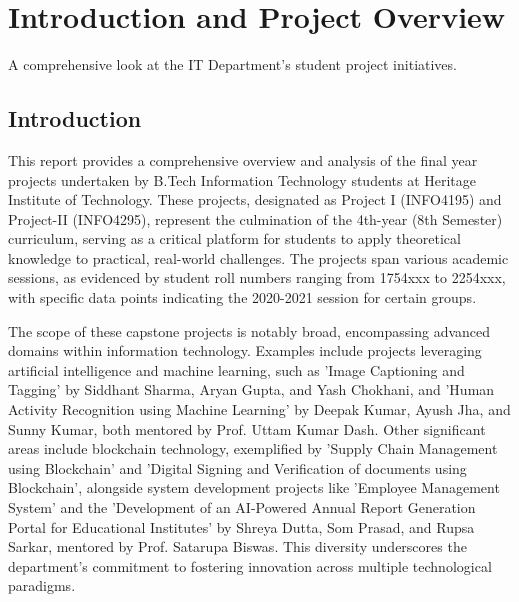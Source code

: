 \documentclass[11pt,a4paper]{article}
\newenvironment{card}{
    \begin{tcolorbox}[
        enhanced,
        colback=cardback,
        colframe=border,
        sharp corners,
        boxrule=0.5pt,
        drop shadow,
        drop shadow={shadow xshift=1mm,shadow yshift=-1mm,fill=border!50},
        boxsep=3mm,
        left=5mm, right=5mm, top=5mm, bottom=5mm,
        width=\textwidth,
        nobeforeafter
    ]
}{\end{tcolorbox}}
\begin{document}
\clearpage

\section*{\textcolor{accent}{Introduction and Project Overview}}
{\large\textcolor{muted}{A comprehensive look at the IT Department's student project initiatives.}}

\vspace{0.5cm}

\begin{card}
    \subsection*{\textcolor{accent}{Introduction}}
    \vspace{0.3cm}
    This report provides a comprehensive overview and analysis of the final year projects undertaken by B.Tech Information Technology students at Heritage Institute of Technology. These projects, designated as Project I (INFO4195) and Project-II (INFO4295), represent the culmination of the 4th-year (8th Semester) curriculum, serving as a critical platform for students to apply theoretical knowledge to practical, real-world challenges. The projects span various academic sessions, as evidenced by student roll numbers ranging from 1754xxx to 2254xxx, with specific data points indicating the 2020-2021 session for certain groups.

    The scope of these capstone projects is notably broad, encompassing advanced domains within information technology. Examples include projects leveraging artificial intelligence and machine learning, such as 'Image Captioning and Tagging' by Siddhant Sharma, Aryan Gupta, and Yash Chokhani, and 'Human Activity Recognition using Machine Learning' by Deepak Kumar, Ayush Jha, and Sunny Kumar, both mentored by Prof. Uttam Kumar Dash. Other significant areas include blockchain technology, exemplified by 'Supply Chain Management using Blockchain' and 'Digital Signing and Verification of documents using Blockchain', alongside system development projects like 'Employee Management System' and the 'Development of an AI-Powered Annual Report Generation Portal for Educational Institutes' by Shreya Dutta, Som Prasad, and Rupsa Sarkar, mentored by Prof. Satarupa Biswas. This diversity underscores the department's commitment to fostering innovation across multiple technological paradigms.


\end{card}
\end{document}
